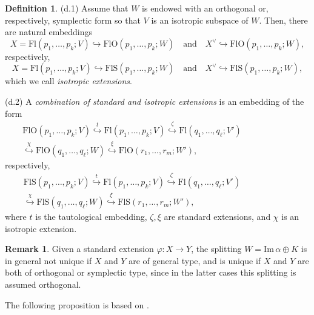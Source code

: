 \documentclass[12pt]{amsart}
\newcommand{\Flags}{\mathrm{Fl}}
\newcommand{\OFlags}{\mathrm{FlO}}
\newcommand{\SFlags}{\mathrm{FlS}}
\theoremstyle{definition}
\newtheorem{definition}[theorem]{Definition}
\newtheorem{remark}[theorem]{Remark}
\begin{document}
\begin{definition}
(d.1) Assume that $W$ is endowed with an orthogonal or, respectively, symplectic form so that $V$ is an isotropic subspace of $W$. Then, there are natural embeddings
$$
X=\Flags(p_1,\ldots,p_k;V)\hookrightarrow \OFlags(p_1,\ldots,p_k;W)\quad\mbox{and}\quad
X^\vee\hookrightarrow \OFlags(p_1,\ldots,p_k;W),
$$
respectively,
$$
X=\Flags(p_1,\ldots,p_k;V)\hookrightarrow \SFlags(p_1,\ldots,p_k;W)\quad\mbox{and}\quad
X^\vee\hookrightarrow \SFlags(p_1,\ldots,p_k;W),
$$
which we call {\it isotropic extensions}.

(d.2) A {\it combination of standard and isotropic extensions} is an embedding of the form
\begin{eqnarray*}
\OFlags(p_1,\ldots,p_k;V)\stackrel{t}{\hookrightarrow}  \Flags(p_1,\ldots,p_k;V)
\stackrel{\zeta}{\hookrightarrow} \Flags(q_1,\ldots,q_\ell;V') \qquad\qquad\qquad
 \\ \stackrel{\chi}{\hookrightarrow} \OFlags(q_1,\ldots,q_\ell;W)
\stackrel{\xi}{\hookrightarrow} \OFlags(r_1,\ldots,r_m;W'),
\end{eqnarray*}
respectively,
\begin{eqnarray*}
\SFlags(p_1,\ldots,p_k;V)\stackrel{t}{\hookrightarrow} \Flags(p_1,\ldots,p_k;V)
\stackrel{\zeta}{\hookrightarrow} \Flags(q_1,\ldots,q_\ell;V') \qquad\qquad\qquad
 \\ \stackrel{\chi}{\hookrightarrow} \SFlags(q_1,\ldots,q_\ell;W)
\stackrel{\xi}{\hookrightarrow} \SFlags(r_1,\ldots,r_m;W'),
\end{eqnarray*}
where $t$ is the tautological embedding, $\zeta,\xi$ are standard extensions, and $\chi$ is an isotropic extension.
\end{definition}

\begin{remark}
\label{remark-3.4}
Given a standard extension $\varphi:X\to Y$, the splitting $W=\mathrm{Im}\,\alpha\oplus K$ is in general not unique if $X$ and $Y$ are of general type, and is unique if $X$ and $Y$ are both of orthogonal or symplectic type, since in the latter cases this splitting is assumed orthogonal.
\end{remark}

The following proposition is based on \cite[Proposition 2.3]{PT}.
\end{document}
